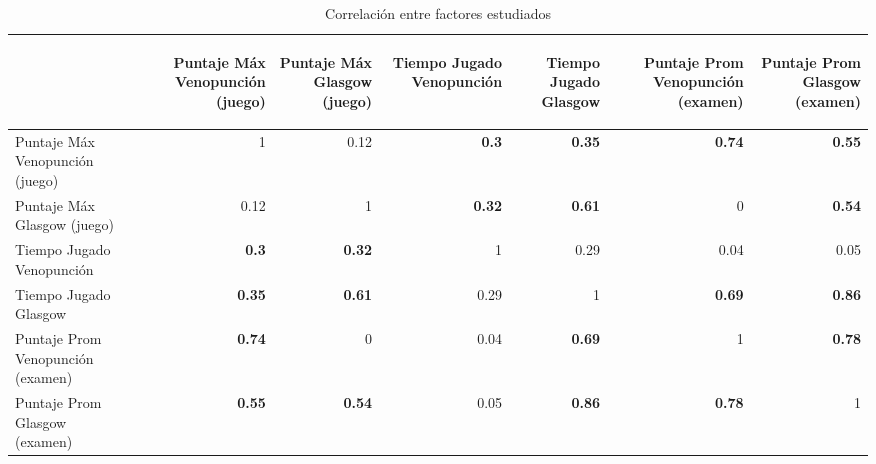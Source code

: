 \begin{table}[H]
\centering
\caption{Correlación entre factores estudiados} 
\begin{tabular}{lrrrrrr}
\toprule
        &
\begin{sideways}\textbf{Puntaje Máx Venopunción (juego)}\end{sideways}  &
\begin{sideways}\textbf{Puntaje Máx Glasgow (juego)}\end{sideways}        &
\begin{sideways}\textbf{Tiempo Jugado Venopunción}\end{sideways}         &
\begin{sideways}\textbf{Tiempo Jugado Glasgow}\end{sideways} &
\begin{sideways}\textbf{Puntaje Prom Venopunción (examen)}\end{sideways}  &
\begin{sideways}\textbf{Puntaje Prom Glasgow (examen)}\end{sideways}    \\
\midrule
Puntaje Máx Venopunción (juego)    & 1    & 0.12  & \textbf{0.3}   & \textbf{0.35} & \textbf{0.74} & \textbf{0.55} \\
Puntaje Máx Glasgow (juego)       & 0.12 & 1     & \textbf{0.32} & \textbf{0.61} & 0 & \textbf{0.54}\\
Tiempo Jugado Venopunción     		 & \textbf{0.3}  & \textbf{0.32} & 1  & 0.29 & 0.04 & 0.05\\
Tiempo Jugado Glasgow 				 & \textbf{0.35} & \textbf{0.61}  & 0.29  & 1    & \textbf{0.69} & \textbf{0.86}\\
Puntaje Prom Venopunción (examen) & \textbf{0.74} & 0 	& 0.04  & \textbf{0.69} & 1 & \textbf{0.78} \\
Puntaje Prom Glasgow (examen)    		 & \textbf{0.55} & \textbf{0.54} & 0.05  & \textbf{0.86} & \textbf{0.78} & 1 \\
\bottomrule               
\end{tabular}

\label{tab:all_correlation}
\end{table}



